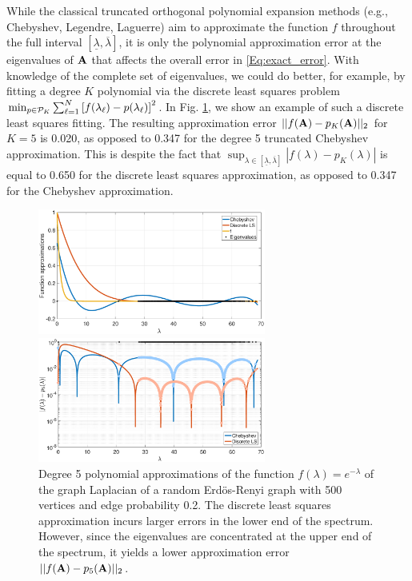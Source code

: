 \documentclass{article}
\begin{document}
While the classical truncated orthogonal polynomial expansion methods (e.g., Chebyshev, Legendre, Laguerre) aim to approximate the function $f$ throughout the full interval $[\underline{\lambda},\overline{\lambda}]$, it is only the polynomial approximation error at the eigenvalues of ${\bf A}$ that affects the overall error in \eqref{Eq:exact_error}. With knowledge of the complete set of eigenvalues, we could do better, for example, by fitting a degree $K$ polynomial via the discrete least squares problem $\min_{p \in {\cal P}_K} \sum_{\ell=1}^N \left[f(\lambda_{\ell})-p(\lambda_{\ell})\right]^2$. In Fig. \ref{Fig:dls}, we show an example of such a discrete least squares fitting. The resulting approximation error $||f({\bf A})-p_K({\bf A})||_2$ for $K=5$ is 0.020, as opposed to 0.347 for the degree 5 truncated Chebyshev approximation. This is despite the fact that $\sup_{\lambda \in [\underline{\lambda},\overline{\lambda}]}|f(\lambda)-p_K(\lambda)|$ is equal to 0.650 for the discrete least squares approximation, as opposed to 0.347 for the Chebyshev approximation.

\begin{figure}[t]
\centerline{\includegraphics[width=7.5cm]{fig_motivation1}}
\centerline{\includegraphics[width=7.5cm]{fig_motivation2}}
\caption{Degree 5 polynomial approximations of the function $f(\lambda)=e^{-\lambda}$ of the graph Laplacian of a random Erd\"{o}s-Renyi graph with 500 vertices and edge probability 0.2. The discrete least squares approximation incurs larger errors in the lower end of the spectrum. However, since the eigenvalues are concentrated at the upper end of the spectrum, it yields a lower approximation error $||f({\bf A})-p_5({\bf A})||_2$.}
\label{Fig:dls}
\end{figure}
\end{document}
